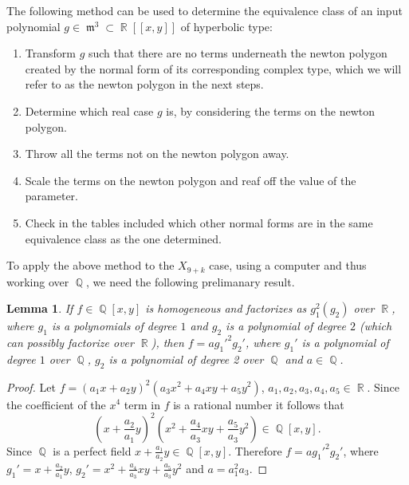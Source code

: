 \documentclass[noend]{amsproc}
\newtheorem{lemma}[theorem]{Lemma}
\theoremstyle{definition}
\DeclareMathOperator{\m}{\mathfrak{m}}
\DeclareMathOperator{\Q}{\mathbb{Q}}
\DeclareMathOperator{\R}{\mathbb{R}}
\begin{document}
The following method can be used to determine the equivalence class of an input polynomial $g\in\m^3\subset\R[[x,y]]$ of hyperbolic type:

\begin{enumerate}
\item Transform $g$ such that there are no terms underneath the newton polygon created by the normal form of its corresponding complex type, which we will refer to as the newton polygon in the next steps.
\item Determine which real case $g$ is, by considering the terms on the newton polygon.
\item Throw all the terms not on the newton polygon away.
\item Scale the terms on the newton polygon and reaf off the value of the parameter.
\item Check in the tables included \cite{realclassify2} which other normal forms are in the same equivalence class as the one determined.
\end{enumerate}

To apply the above method to the $X_{9+k}$ case, using a computer and thus working over $\Q$, we need the following prelimanary result.

\begin{lemma}\label{J10+kfactorization}
If $f\in\Q[x,y]$ is homogeneous and factorizes as $g_1^2(g_2)$ over $\R$, where $g_1$ is a polynomials of degree $1$ and $g_2$ is a polynomial of degree $2$ (which can possibly factorize over $\R$), then $f=ag_1'^2g_2'$, where $g_1'$ is a polynomial of degree $1$ over $\Q$, $g_2$ is a polynomial of degree 2 over $\Q$ and $a\in\Q$.
\end{lemma}

\begin{proof}
Let $f=(a_1x+a_2y)^2(a_3x^2+a_4xy+a_5y^2)$, $a_1,a_2,a_3,a_4,a_5\in\R$. Since the coefficient of the $x^4$ term in $f$ is a rational number it follows that 
\[(x+\frac{a_2}{a_1}y)^2(x^2+\frac{a_4}{a_3}xy+\frac{a_5}{a_3}y^2)\in\Q[x,y].\]
Since $\Q$ is a perfect field
$x+\frac{a_1}{a_2}y\in\Q[x,y]$. Therefore $f=ag_1'^2g_2'$, where
$g_1'=x+\frac{a_2}{a_1}y$, $g_2'=x^2+\frac{a_4}{a_3}xy+\frac{a_5}{a_3}y^2$ and $a=a_1^2a_3$.
\end{proof}
\end{document}
